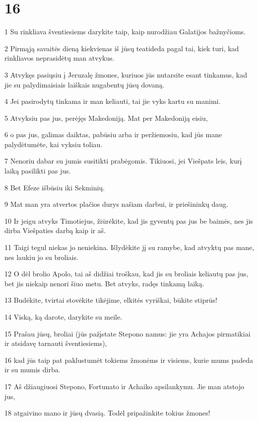 \chapter{16}


\par 1 Su rinkliava šventiesiems darykite taip, kaip nurodžiau Galatijos bažnyčioms. 
\par 2 Pirmąją savaitės dieną kiekvienas iš jūsų teatideda pagal tai, kiek turi, kad rinkliavos neprasidėtų man atvykus. 
\par 3 Atvykęs pasiųsiu į Jeruzalę žmones, kuriuos jūs nutarsite esant tinkamus, kad jie su palydimaisiais laiškais nugabentų jūsų dovaną. 
\par 4 Jei pasirodytų tinkama ir man keliauti, tai jie vyks kartu su manimi. 
\par 5 Atvyksiu pas jus, perėjęs Makedoniją. Mat per Makedoniją eisiu, 
\par 6 o pas jus, galimas daiktas, pabūsiu arba ir peržiemosiu, kad jūs mane palydėtumėte, kai vyksiu toliau. 
\par 7 Nenoriu dabar su jumis susitikti prabėgomis. Tikiuosi, jei Viešpats leis, kurį laiką pasilikti pas jus. 
\par 8 Bet Efeze išbūsiu iki Sekminių. 
\par 9 Mat man yra atvertos plačios durys našiam darbui, ir priešininkų daug. 
\par 10 Ir jeigu atvyks Timotiejus, žiūrėkite, kad jis gyventų pas jus be baimės, nes jis dirba Viešpaties darbą kaip ir aš. 
\par 11 Taigi tegul niekas jo neniekina. Išlydėkite jį su ramybe, kad atvyktų pas mane, nes laukiu jo su broliais. 
\par 12 O dėl brolio Apolo, tai aš didžiai troškau, kad jis su broliais keliautų pas jus, bet jis niekaip nenori šiuo metu. Bet atvyks, radęs tinkamą laiką. 
\par 13 Budėkite, tvirtai stovėkite tikėjime, elkitės vyriškai, būkite stiprūs! 
\par 14 Viską, ką darote, darykite su meile. 
\par 15 Prašau jūsų, broliai (jūs pažįstate Stepono namus: jie yra Achajos pirmatikiai ir atsidavę tarnauti šventiesiems), 
\par 16 kad jūs taip pat paklustumėt tokiems žmonėms ir visiems, kurie mums padeda ir su mumis dirba. 
\par 17 Aš džiaugiuosi Stepono, Fortunato ir Achaiko apsilankymu. Jie man atstojo jus, 
\par 18 atgaivino mano ir jūsų dvasią. Todėl pripažinkite tokius žmones! 
